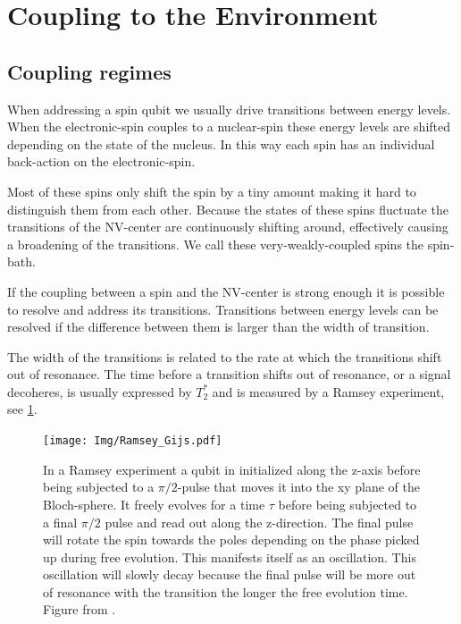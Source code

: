 \section{Coupling to the Environment}


\subsection{Coupling regimes}
When addressing a spin qubit we usually drive transitions between energy levels.
When the electronic-spin couples to a nuclear-spin these energy levels are shifted depending on the state of the nucleus.
In this way each spin has an individual back-action on the electronic-spin.

Most of these spins only shift the spin by a tiny amount making it hard to distinguish them from each other.
Because the states of these spins fluctuate the transitions of the NV-center are continuously shifting around, effectively causing a broadening of the transitions.
We call these very-weakly-coupled spins the spin-bath.

If the coupling between a spin and the NV-center is strong enough it is possible to resolve and address its transitions.
Transitions between energy levels can be resolved if the difference between them is larger than the width of transition.


The width of the transitions is related to the rate at which the transitions shift out of resonance.
The time before a transition shifts out of resonance, or a signal decoheres, is usually expressed by $T_2^*$ and is measured by a Ramsey experiment, see \cref{fig:Ramsey_gijs}.

\begin{figure}[htbp]
    \centering
    \texttt{[image: Img/Ramsey\_Gijs.pdf]}
    \caption{In a Ramsey experiment a qubit in initialized along the z-axis before being subjected to a $\pi/2$-pulse that moves it into the xy plane of the Bloch-sphere. It freely evolves for a time $\tau$ before being subjected to a final $\pi/2$ pulse and read out along the z-direction.
The final pulse will rotate the spin towards the poles depending on the phase picked up during free evolution. This manifests itself as an oscillation. This oscillation will slowly decay because the final pulse will be more out of resonance with the transition the longer the free evolution time. Figure from \citep{Lange2012Quantum}.}
    \label{fig:Ramsey_gijs}
\end{figure}

